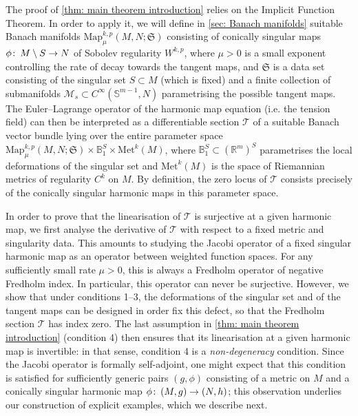 \documentclass{article}
\numberwithin{equation}{section}        %
\theoremstyle{bfnote}
\theoremstyle{definition}
\theoremstyle{bfremark}
\newcommand{\col}{\colon \thinspace}        %
\newcommand{\R}{\mathbb{R}}                 %
\newcommand{\Ball}{\mathbb{B}}              %
\newcommand{\Sp}{\mathbb{S}}                %
\newcommand{\Map}{\mathrm{Map}}             %
\newcommand{\Met}{\mathrm{Met}}             %
\begin{document}
The proof of \cref{thm: main theorem introduction} relies on the Implicit Function Theorem. In order to apply it, we will define in \cref{sec: Banach manifolds} suitable Banach manifolds $\Map^{k,p}_{\mu}(M,N;\mathfrak{S})$ consisting of conically singular maps $\phi \col M\setminus S\to N$ of Sobolev regularity $W^{k,p}$, where $\mu > 0$ is a small exponent controlling the rate of decay towards the tangent maps, and $\mathfrak{S}$ is a data set consisting of the singular set $S \subset M$ (which is fixed) and a finite collection of submanifolds $\mathcal{M}_s \subset C^{\infty}(\Sp^{m-1},N)$ parametrising the possible tangent maps. The Euler--Lagrange operator of the harmonic map equation (i.e. the tension field) can then be interpreted as a differentiable section $\mathcal{T}$ of a suitable Banach vector bundle lying over the entire parameter space $\Map^{k,p}_{\mu}(M,N;\mathfrak{S}) \times \Ball_1^{S} \times \Met^k(M)$, where $\Ball_1^S \subset (\R^m)^S$ parametrises the local deformations of the singular set and $\Met^k(M)$ is the space of Riemannian metrics of regularity $C^k$ on $M$. By definition, the zero locus of $\mathcal{T}$ consists precisely of the conically singular harmonic maps in this parameter space. 

In order to prove that the linearisation of $\mathcal{T}$ is surjective at a given harmonic map, we first analyse the derivative of $\mathcal{T}$ with respect to a fixed metric and singularity data. This amounts to studying the Jacobi operator of a fixed singular harmonic map as an operator between weighted function spaces. For any sufficiently small rate $\mu > 0$, this is always a Fredholm operator of negative Fredholm index. In particular, this operator can never be surjective. However, we show that under conditions 1--3, the deformations of the singular set and of the tangent maps can be designed in order fix this defect, so that the Fredholm section $\mathcal{T}$ has index zero. The last assumption in \cref{thm: main theorem introduction} (condition 4) then ensures that its linearisation at a given harmonic map is invertible: in that sense, condition 4 is a \emph{non-degeneracy} condition. Since the Jacobi operator is formally self-adjoint, one might expect that this condition is satisfied for sufficiently generic pairs $(g,\phi)$ consisting of a metric on $M$ and a conically singular harmonic map $\phi \col (M,g)\to (N,h)$; this observation underlies our construction of explicit examples, which we describe next.
\end{document}
